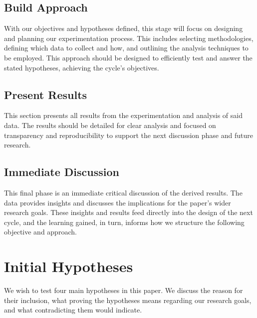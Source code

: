 \subsection*{Build Approach}
With our objectives and hypotheses defined, this stage will focus on designing and planning our experimentation process. This includes selecting methodologies, defining which data to collect and how, and outlining the analysis techniques to be employed. This approach should be designed to efficiently test and answer the stated hypotheses, achieving the cycle's objectives.

\subsection*{Present Results}
This section presents all results from the experimentation and analysis of said data. The results should be detailed for clear analysis and focused on transparency and reproducibility to support the next discussion phase and future research.

\subsection*{Immediate Discussion}
This final phase is an immediate critical discussion of the derived results. The data provides insights and discusses the implications for the paper's wider research goals. These insights and results feed directly into the design of the next cycle, and the learning gained, in turn, informs how we structure the following objective and approach.


\section{Initial Hypotheses}
We wish to test four main hypotheses in this paper. We discuss the reason for their inclusion, what proving the hypotheses means regarding our research goals, and what contradicting them would indicate.

